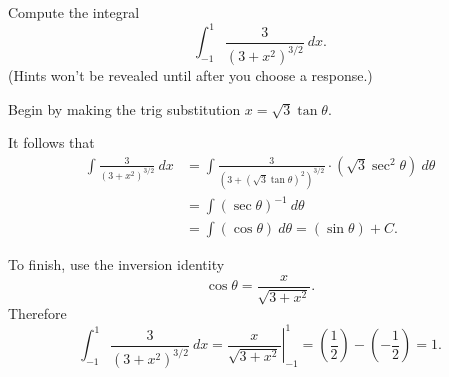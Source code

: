 \documentclass{ximera}
\begin{document}
\begin{question}%

Compute the integral 
\[\int_{-1}^{1}\frac{3}{(3+x^2)^{3/2}}~dx.\]
(Hints won't be revealed until after you choose a response.)
\begin{multiplechoice}
\end{multiplechoice}
\begin{feedback}
Begin by making the trig substitution \(x=\sqrt{3}\tan \theta\). \begin{hint} It follows that 
\[ \begin{aligned} \int\frac{3}{(3+x^2)^{3/2}}~dx & = \int \frac{3}{(3+(\sqrt{3}\tan \theta)^2)^{3/2}} \cdot (\sqrt{3}\sec^2 \theta)~d \theta \\
 & = \int (\sec \theta)^{-1}~d \theta \\ & = \int (\cos \theta) ~ d \theta = (\sin \theta) + C. \end{aligned} \] \begin{hint}
To finish, use the inversion identity \[\cos \theta = \frac{x}{\sqrt{3+x^2}}.\]
Therefore \[\int_{-1}^{1}\frac{3}{(3+x^2)^{3/2}}~dx = \left.\frac{x}{\sqrt{3+x^2}}\right|_{-1}^{1} = \left(\frac{1}{2}\right) - \left(-\frac{1}{2}\right) = 1.\] \end{hint} \end{hint}
\end{feedback}

\end{question}
\end{document}
